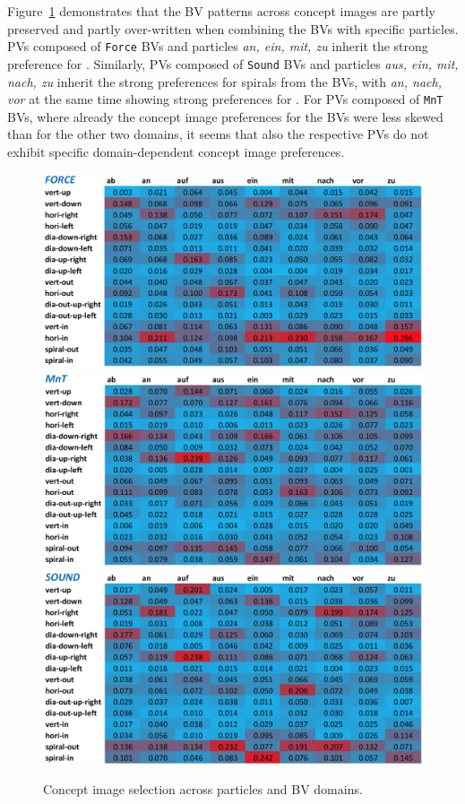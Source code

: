 \documentclass[output=paper]{langsci/langscibook}
\begin{document}
Figure~\ref{fig:particle-prop-domain} demonstrates that the BV
patterns across concept images are partly preserved and partly
over-written when combining the BVs with specific particles. PVs
composed of \texttt{Force} BVs and particles \textit{an, ein, mit, zu}
inherit the strong preference for . Similarly, PVs
composed of \texttt{Sound} BVs and particles \textit{aus, ein, mit,
  nach, zu} inherit the strong preferences for spirals from the BVs,
with \textit{an, nach, vor} at the same time showing strong
preferences for . For PVs composed of \texttt{MnT}
BVs, where already the concept image preferences for the BVs were less
skewed than for the other two domains, it seems that also the
respective PVs do not exhibit specific domain-dependent concept image
preferences.

\begin{figure}[htbp]
  \caption{Concept image selection across particles and BV domains.}
  \label{fig:particle-prop-domain}
  \includegraphics[width=0.9\linewidth]{figures/dataset_particles_domains_force}
  \vspace{+2mm}\\
  \includegraphics[width=0.9\linewidth]{figures/dataset_particles_domains_mnt}
  \vspace{+2mm}\\
  \includegraphics[width=0.9\linewidth]{figures/dataset_particles_domains_sound}
\end{figure}
\end{document}
